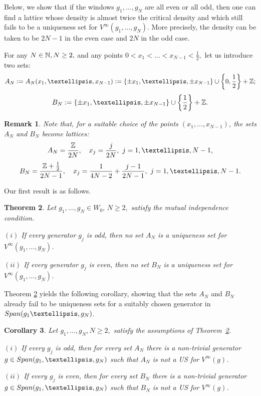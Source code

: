 \documentclass[10pt,a4paper]{amsart}
\numberwithin{equation}{section}
\newtheorem{theorem}{Theorem}[section]
\newtheorem{remark}[theorem]{Remark}\newtheorem{proposition}[theorem]{Proposition}\newtheorem{definition}[theorem]{Definition}
\newtheorem{corollary}[theorem]{Corollary} \newcommand{\La}{\Lambda}
\begin{document}
Below, we show that if the windows $g_1,\dots,g_N$ are all even or all odd, then one can find a lattice whose density is almost twice the critical density and which still fails to be  a uniqueness set for $V^{\infty}(g_1,\dots,g_N)$. More precisely, the density can be taken to be $2N-1$ in the even case and $2N$ in the odd case.


For any $N\in{\mathbb N}, N\geq 2,$ and any points $0<x_1< \dots <x_{N-1}<\frac{1}{2},$ let us introduce two sets: $$A_N:=A_N(x_1,\dots,x_{N-1}):=\{\pm x_1,\dots,\pm x_{N-1}\}\cup\left\{0,\frac{1}{2}\right\}+\Z;$$$$B_N:=\{\pm x_1,\dots,\pm x_{N-1}\}\cup\left\{\frac{1}{2}\right\}+\Z.$$

\begin{remark}\label{rem:lattice}
    Note that, for a suitable choice of the points $(x_1,\dots,x_{N-1})$, the sets $A_N$ and $B_N$ become lattices:
    $$A_N = \frac{\Z}{2N}, \quad x_j = \frac{j}{2N}, \,\, j=1,\dots, N-1,$$
    $$B_N = \frac{\Z+\frac{1}{2}}{2N-1}, \quad x_j = \frac{1}{4N-2}+\frac{j-1}{2N-1}, \,\, j=1,\dots, N-1.$$
\end{remark}


Our first result is as follows.

\begin{theorem}\label{t} Let  $g_1,...,g_N\in W_0, \, N\geq 2,$ satisfy the mutual independence condition.

$(i)$ If every generator $g_j$ is odd, then no set $A_N$ is a uniqueness set for $V^\infty(g_1,\dots,g_N)$.

$(ii)$ If every generator $g_j$ is even, then no set $B_N$ is a uniqueness set for $V^\infty(g_1,\dots,g_N)$.\end{theorem}
Theorem  \ref{t} yields the following corollary, showing that the sets $A_N$  and $B_N$  already fail to be uniqueness sets for a suitably chosen generator in 
${\rm Span}(g_1\dots,g_N)$.


\begin{corollary} \label{cor:AN_g}
    Let $g_1,\dots,g_N, N\geq 2,$ satisfy the assumptions of Theorem~\ref{t}. 
    
$(i)$ If every $g_j$ is odd, then for every set $A_N$ there is a non-trivial generator $g\in {\rm Span}(g_1,\dots,g_N)$ such that $A_N$ is not a US for $V^\infty(g)$. 

    $(ii)$ If every $g_j$ is even, then for every set $B_N$ there is a non-trivial generator $g\in {\rm Span}(g_1,\dots,g_N)$ such that $B_N$ is not a US for $V^\infty(g)$. 
\end{corollary}
\end{document}
